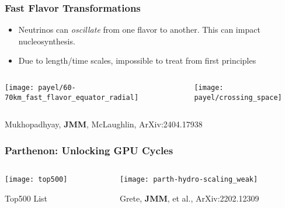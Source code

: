 \documentclass[]{beamer}
\begin{document}
\begin{frame}
  \frametitle{Fast Flavor Transformations}
  \begin{itemize}
  \item Neutrinos can \textit{oscillate} from one flavor to
    another. This can impact nucleosynthesis.
  \item Due to length/time scales, impossible to treat from first principles
  \end{itemize}
  \begin{columns}
    \begin{column}{6cm}
      \begin{center}
        \texttt{[image: payel/60-70km\_fast\_flavor\_equator\_radial]}
      \end{center}
    \end{column}
    \begin{column}{6cm}
      \begin{center}
        \texttt{[image: payel/crossing\_space]}
      \end{center}
    \end{column}
  \end{columns}
  {\footnotesize Mukhopadhyay, \textbf{JMM}, McLaughlin, ArXiv:2404.17938}
\end{frame}

\begin{frame}
  \frametitle{Parthenon: Unlocking GPU Cycles}
  \begin{columns}
    \begin{column}{6cm}
      \begin{center}
        \texttt{[image: top500]}
      \end{center}
      {\footnotesize Top500 List}
    \end{column}
    \begin{column}{6cm}
      \begin{center}
        \texttt{[image: parth-hydro-scaling\_weak]}
      \end{center}
      {\footnotesize Grete, \textbf{JMM}, et al., ArXiv:2202.12309}
    \end{column}
  \end{columns}
\end{frame}
\end{document}
